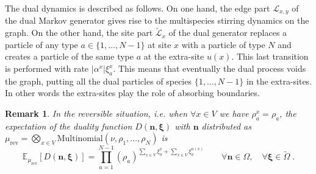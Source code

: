 \documentclass[10pt]{article}
\numberwithin{equation}{section}
\numberwithin{equation}{subsection}
\newtheorem{remark}{Remark}
\newcommand{\dt}{\;.}
\newcommand{\twoj}{\nu}
\begin{document}
\begin{comment}
We define the duality function of the open multispecies stirring process as
\begin{equation}\label{dualityElements}
	D(\bm{n},\bm{\xi})=\prod_{x\in V}\left(\frac{(\nu -\sum_{a=1}^{N-1}\xi_{a}^{x})!}{\nu!}\prod_{a=1}^{N-1}\frac{n_{a}^{x}!}{(n_{a}^{x}-\xi_{a}^{x})!}\left(\rho_{a}^{x}\right)^{\xi_{a}^{u(x)}}\,\right)
\end{equation}
where we recall the notation (see \eqref{rhox}) for the \textit{density} of the species $a\in \{1,\ldots,N-1\}$ imposed by the reservoir at site $x\in V$:
\begin{equation}
\rho_{a}^{x}=\frac{\alpha_{a}^{x}}{|\alpha^{x}|}\dt
\end{equation}
The dual process is defined by its Markov generator, which reads
 \begin{equation}\label{DualGenerator}
    \widetilde{\mathcal{L}}=\sum_{(x,y)\in \mathcal{E}}\omega_{x,y}\mathcal{L}_{x,y}+\sum_{x\in V}\Gamma_{x}\widetilde{\mathcal{L}}_{x}
\end{equation}
where 
$\mathcal{L}_{x,y}$ is defined in \eqref{edgeGenerator} and, for any function $f:\widetilde{\Omega}\to \mathbb{R}$ 
\begin{equation}\label{siteDualGenerator}
    \widetilde{\mathcal{L}}_{x}f(\bm{\xi})=|\alpha^{x}|\sum_{a=1}^{N-1}\xi_{a}^{x}\left(f(\bm{\xi}-\bm{\delta}_{a}^{x}+\bm{\delta}_{N}^{x}+\bm{\delta}_{a}^{u(x)})-f(\bm{\xi})\right)\dt
\end{equation}
\newline
\end{comment}
The dual dynamics is described as follows. On one hand, the edge part $\mathcal{L}_{x,y}$ of the dual Markov generator gives rise to  the multispecies stirring dynamics on the graph. On the other hand, the site
part $\widetilde{\mathcal{L}}_{x}$ of the dual generator replaces a particle of any type $a\in\{1,\ldots,N-1\}$ at site $x$ with a particle of type $N$ and creates a particle of the same type $a$ at the extra-site $u(x)$. This last transition is performed with rate $|\alpha^{x}|\xi_{a}^{x}$. This means that eventually the dual process voids the graph, putting all the dual particles of species $\{1,\ldots,N-1\}$ in the extra-sites. In other words the extra-sites play the role of absorbing boundaries. 
\begin{remark} In the reversible situation, i.e. when $\forall x\in V$ we have $\rho_{a}^{x}=\rho_{a}$, the expectation  of the duality function  $D(\bm{n},\bm{\xi})$ with   $\bm{n}$ distributed as  $\mu_{\text{rev}} = \bigotimes_{x\in V}\text{Multinomial}\left(\twoj, \rho_{1},\ldots,\rho_{N}\right)$ is
\begin{equation}
\mathbb{E}_{\mu_{\text{rev}}}\left[D(\bm{n},\bm{\xi})\right]=\prod_{a=1}^{N-1}\left(\rho_{a}\right)^{\sum_{x\in V}\xi_{a}^{x}+\sum_{x\in V}\xi_{a}^{u(x)}}\qquad \forall \bm{n}\in \Omega,\quad\forall \bm{\xi}\in \widetilde{\Omega}\dt
\end{equation}
\end{remark}
%
%
\end{document}
